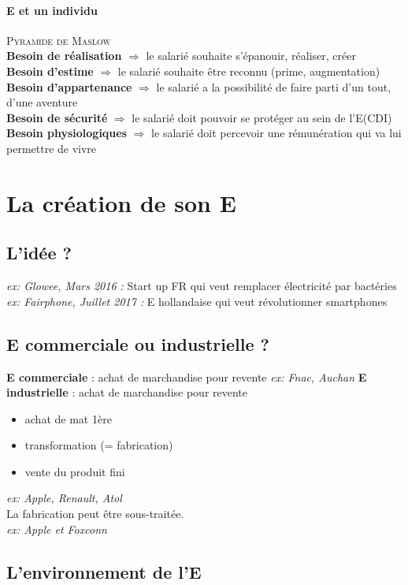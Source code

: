 \documentclass[a4paper,11pt]{report}
\begin{document}
\subsubsection{E et un individu}
\textsc{Pyramide de Maslow}\\
\textbf{Besoin de réalisation} $\Rightarrow$ le salarié souhaite s'épanouir, réaliser, créer\\
\textbf{Besoin d'estime} $\Rightarrow$ le salarié souhaite être reconnu (prime, augmentation)\\
\textbf{Besoin d'appartenance} $\Rightarrow$ le salarié a la possibilité de faire parti d'un tout, d'une aventure\\
\textbf{Besoin de sécurité} $\Rightarrow$ le salarié doit pouvoir se protéger au sein de l'E(CDI)\\
\textbf{Besoin physiologiques} $\Rightarrow$ le salarié doit percevoir une rémunération qui va lui permettre de vivre\\

\chapter{La création de son E}
\section{L'idée ?}
\textit{ex: Glowee, Mars 2016 :} Start up FR qui veut remplacer électricité par bactéries\\
\textit{ex: Fairphone, Juillet 2017 :} E hollandaise qui veut révolutionner smartphones
\section{E commerciale ou industrielle ?}
\textbf{E commerciale} : achat de marchandise pour revente \textit{ex: Fnac, Auchan}
\textbf{E industrielle} : achat de marchandise pour revente 
\begin{itemize}
    \item achat de mat 1ère
    \item transformation (= fabrication)
    \item vente du produit fini
\end{itemize} 
\textit{ex: Apple, Renault, Atol} \\
La fabrication peut être sous-traitée. \\
\textit{ex: Apple et Foxconn}
\section{L'environnement de l'E}
\end{document}
